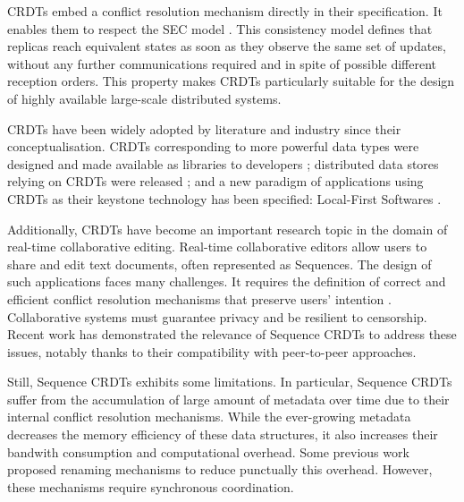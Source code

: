 \documentclass[10pt,journal,compsoc]{IEEEtran}
\begin{document}
\acp{CRDT} embed a conflict resolution mechanism directly in their specification.
It enables them to respect the \ac{SEC} model \cite{shapiro_2011_crdt}.
This consistency model defines that replicas reach equivalent states as soon as they observe the same set of updates, without any further communications required and in spite of possible different reception orders.
This property makes \acp{CRDT} particularly suitable for the design of highly available large-scale distributed systems.

\acp{CRDT} have been widely adopted by literature and industry since their conceptualisation.
\acp{CRDT} corresponding to more powerful data types were designed and made available as libraries to developers \cite{Nicolaescu2016YATA,yjsimplem, jsoncrdt2017, automerge};
distributed data stores relying on \acp{CRDT} were released \cite{RiakKV, AntidoteDB, Anna2021, Concordant};
and a new paradigm of applications using \acp{CRDT} as their keystone technology has been specified: Local-First Softwares \cite{localfirstsoftware2019, pushpin2020}.

Additionally, \acp{CRDT} have become an important research topic in the domain of real-time collaborative editing.
Real-time collaborative editors allow users to share and edit text documents, often represented as Sequences.
The design of such applications faces many challenges.
It requires the definition of correct and efficient conflict resolution mechanisms that preserve users' intention \cite{10.1145/289444.289469}.
Collaborative systems must guarantee privacy and be resilient to censorship.
Recent work \cite{ahmednacer:inria-00629503, Nedelec2016CRATE, MUTE2017} has demonstrated the relevance of Sequence \acp{CRDT} to address these issues, notably thanks to their compatibility with peer-to-peer approaches.

Still, Sequence \acp{CRDT} exhibits some limitations.
In particular, Sequence \acp{CRDT} suffer from the accumulation of large amount of metadata over time due to their internal conflict resolution mechanisms.
While the ever-growing metadata decreases the memory efficiency of these data structures, it also increases their bandwith consumption and computational overhead.
Some previous work proposed renaming mechanisms \cite{letia:hal-01248270,zawirski:hal-01248197} to reduce punctually this overhead.
However, these mechanisms require synchronous coordination.
\end{document}
